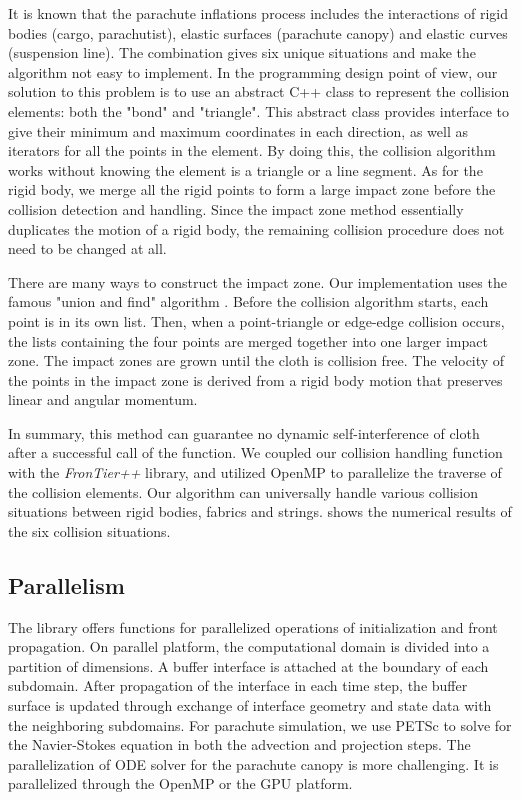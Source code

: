 It is known that the parachute inflations process includes the interactions of rigid bodies (cargo, parachutist), elastic surfaces (parachute canopy) and elastic curves (suspension line). The combination gives six unique situations and make the algorithm not easy to implement. In the programming design point of view, our solution to this problem is to use an abstract C++ class to represent the collision elements: both the "bond" and "triangle". This abstract class provides interface to give their minimum and maximum coordinates in each direction, as well as iterators for all the points in the element. By doing this, the collision algorithm works without knowing the element is a triangle or a line segment. As for the rigid body, we merge all the rigid points to form a large impact zone before the collision detection and handling. Since the impact zone method essentially duplicates the motion of a rigid body, the remaining collision procedure does not need to be changed at all. 

There are many ways to construct the impact zone. Our implementation uses the famous "union and find" algorithm \cite{}. Before the collision algorithm starts, each point is in its own list. Then, when a point-triangle or edge-edge collision occurs, the lists containing the four points are merged together into one larger impact zone. The impact zones are grown until the cloth is collision free. The velocity of the points in the impact zone is derived from a rigid body motion that preserves linear and angular momentum.

In summary, this method can guarantee no dynamic self-interference of cloth after a successful call of the function. We coupled our collision handling function with the {\it
FronTier++} library, and utilized OpenMP to parallelize the traverse of the collision elements. Our algorithm can universally handle various collision situations between rigid bodies, fabrics and strings.  shows the numerical results of the six collision situations.

\subsection{Parallelism} 
The \FronTierp library offers functions for parallelized
operations of initialization and front propagation. On parallel platform, the
computational domain is divided into a partition of dimensions. A buffer
interface is attached at the boundary of each subdomain. After propagation of
the interface in each time step, the buffer surface is updated through exchange
of interface geometry and state data with the neighboring subdomains. For
parachute simulation, we use PETSc to solve for the Navier-Stokes equation in
both the advection and projection steps.  The parallelization of ODE solver for
the parachute canopy is more challenging.  It is parallelized through the OpenMP
or the GPU platform.


